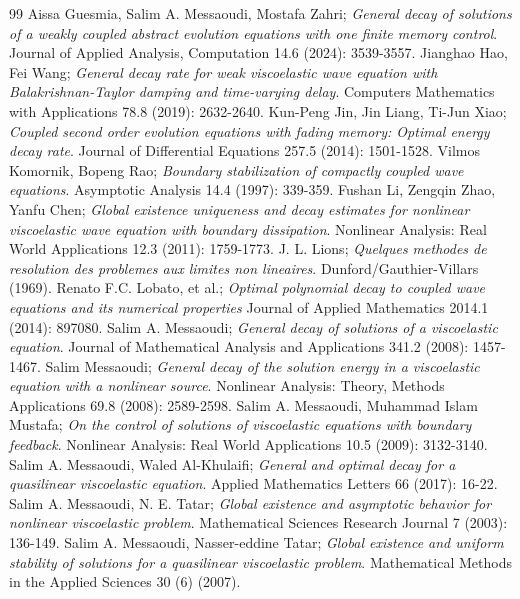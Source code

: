 \documentclass[10pt,a4paper]{amsart}
\numberwithin{equation}{section}
\begin{document}
\begin{thebibliography}{99}
 Aissa Guesmia, Salim A. Messaoudi, Mostafa Zahri; \emph{General decay of solutions of a weakly coupled abstract evolution equations with one finite memory control}. Journal of Applied Analysis, Computation 14.6 (2024): 3539-3557.
 Jianghao Hao,  Fei Wang; \emph{General decay rate for weak viscoelastic wave equation with Balakrishnan-Taylor damping and time-varying delay}. Computers Mathematics with Applications 78.8 (2019): 2632-2640.
 Kun-Peng Jin, Jin Liang,  Ti-Jun Xiao; \emph{Coupled second order evolution equations with fading memory: Optimal energy decay rate}. Journal of Differential Equations 257.5 (2014): 1501-1528.
 Vilmos Komornik, Bopeng Rao; \emph{Boundary stabilization of compactly coupled wave equations}. Asymptotic Analysis 14.4 (1997): 339-359.
 Fushan Li, Zengqin Zhao, Yanfu Chen; \emph{Global existence uniqueness and decay estimates for nonlinear viscoelastic wave equation with boundary dissipation}. Nonlinear Analysis: Real World Applications 12.3 (2011): 1759-1773.
 J. L. Lions; \emph{Quelques methodes de resolution des problemes aux limites non lineaires}. Dunford/Gauthier-Villars (1969).
 Renato F.C. Lobato, et al.; \emph{Optimal polynomial decay to coupled wave equations and its numerical properties} Journal of Applied Mathematics 2014.1 (2014): 897080.
 Salim A. Messaoudi; \emph{General decay of solutions of a viscoelastic equation}. Journal of Mathematical Analysis and Applications 341.2 (2008): 1457-1467.
 Salim Messaoudi; \emph{General decay of the solution energy in a viscoelastic equation with a nonlinear source}. Nonlinear Analysis: Theory, Methods Applications 69.8 (2008): 2589-2598.
 Salim A. Messaoudi,  Muhammad Islam Mustafa; \emph{On the control of solutions of viscoelastic equations with boundary feedback}. Nonlinear Analysis: Real World Applications 10.5 (2009): 3132-3140.
 Salim A. Messaoudi, Waled Al-Khulaifi; \emph{General and optimal decay for a quasilinear viscoelastic equation}. Applied Mathematics Letters 66 (2017): 16-22.
 Salim A. Messaoudi,  N. E. Tatar; \emph{Global existence and asymptotic behavior for nonlinear viscoelastic problem}. Mathematical Sciences Research Journal 7 (2003): 136-149.
 Salim A. Messaoudi,  Nasser-eddine Tatar; \emph{Global existence and uniform stability of solutions for a quasilinear viscoelastic problem}. Mathematical Methods in the Applied Sciences 30 (6) (2007).

\end{thebibliography}
\end{document}
